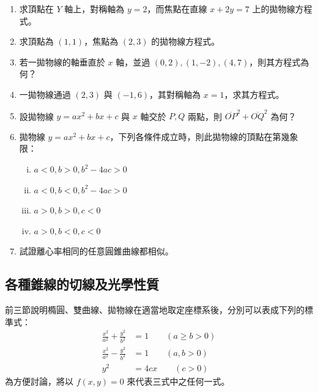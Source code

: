 \begin{enumerate}
  \item 求頂點在 $Y$ 軸上，對稱軸為 $y=2$，而焦點在直線 $x + 2y = 7$ 上的拋物線方程式。

  \item 求頂點為 $(1,1)$，焦點為 $(2,3)$ 的拋物線方程式。

  \item[*\theenumi.] 若一拋物線的軸垂直於 $x$ 軸，並過 $(0,2), (1,-2), (4,7)$，則其方程式為何？

  \item 一拋物線通過 $(2,3)$ 與 $(-1,6)$，其對稱軸為 $x=1$，求其方程式。

  \item 設拋物線 $y = ax^2 + bx + c$ 與 $x$ 軸交於 $P, Q$ 兩點，則 $\overline{OP}^2 + \overline{OQ}^2$ 為何？

  \item 拋物線 $y = ax^2 + bx + c$，下列各條件成立時，則此拋物線的頂點在第幾象限：
  \begin{enumerate}[(i)]
    \item $a < 0, b > 0, b^2 - 4ac > 0$
    \item $a < 0, b < 0, b^2 - 4ac > 0$
    \item $a > 0, b > 0, c < 0$
    \item $a > 0, b < 0, c < 0$
  \end{enumerate}

  \item 試證離心率相同的任意圓錐曲線都相似。
\end{enumerate}

\subsection{各種錐線的切線及光學性質}
\label{sec:b4-3-4}

前三節說明橢圓、雙曲線、拋物線在適當地取定座標系後，分別可以表成下列的標準式：
\begin{align}
\frac{x^2}{a^2} + \frac{y^2}{b^2} &= 1 \qquad (a \ge b > 0) \label{eq:b4-3-4-1} \\
\frac{x^2}{a^2} - \frac{y^2}{b^2} &= 1 \qquad (a, b > 0) \label{eq:b4-3-4-2} \\
y^2 &= 4cx \qquad (c > 0) \label{eq:b4-3-4-3}
\end{align}
為方便討論，將以 $f(x,y) = 0$ 來代表三式中之任何一式。

